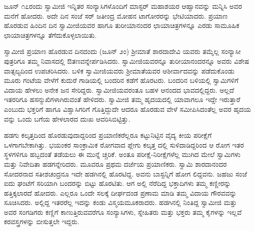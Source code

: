 ಜೂನ್ ೧೭ರಂದು ಸ್ವಾಮೀಜಿ ಇನ್ನಿತರ ಸಂನ್ಯಾಸಿಗಳೊಂದಿಗೆ ಮಾಸ್ಟರ್ ಮಹಾಶಯರ ಆಹ್ವಾನವನ್ನು ಮನ್ನಿಸಿ ಅವರ ಮನೆಗೆ ಹೋದರು. ಅದೇ ದಿನ ಸಂಜೆ ಸರ್ ಜತೀಂದ್ರ ಮೋಹನ ಟಾಗೋರರನ್ನು ಭೇಟಿಯಾದರು. ಪ್ರಯಾಣ ಹೊರಡುವ ಹಿಂದಿನ ದಿನ ಸ್ವಾಮೀಜಿಯವರ ಹಾಗೂ ತುರೀಯಾನಂದರ ಛಾಯಾಚಿತ್ರಗಳನ್ನೂ ಎರಡು ಸಾಮೂಹಿಕ ಛಾಯಾಚಿತ್ರಗಳನ್ನೂ ತೆಗೆದುಕೊಳ್ಳಲಾಯಿತು.

ಸ್ವಾಮೀಜಿ ಪ್ರಯಾಣ ಹೊರಡುವ ದಿನದಂದು (ಜೂನ್ ೨ಂ) ಶ್ರೀಮಾತೆ ಶಾರದಾದೇವಿ ಯವರು ತಮ್ಮೆಲ್ಲ ಸಂನ್ಯಾಸೀ ಪುತ್ರರಿಗೂ ತಮ್ಮ ನಿವಾಸದಲ್ಲಿ ಔತಣವನ್ನೇರ್ಪಡಿಸಿದರು. ಸ್ವಾಮೀಜಿಯವರನ್ನೂ ತುರೀಯಾನಂದರನ್ನೂ ಅವರು ವಿಶೇಷ ವಾತ್ಸಲ್ಯದಿಂದ ಉಪಚರಿಸಿದರು. ಬಳಿಕ ಸ್ವಾಮೀಜಿಯವರು ಶ್ರೀಮಾತೆಯವರ ಆಶೀರ್ವಾದವನ್ನು ಪಡೆದುಕೊಂಡು ಮೂರು ಗಂಟೆಯ ವೇಳೆಗೆ ಕುದುರೆ ಗಾಡಿಯಲ್ಲಿ ಬಂದರಿನ ಕಡೆಗೆ ಹೊರಟರು. ಬಂದರಿನ ಬಳಿಯಲ್ಲಿ ಸ್ವಾಮಿಗಳಿಗೆ ವಿದಾಯ ಹೇಳಲು ಅನೇಕ ಜನ ಸೇರಿದ್ದರು. ಸ್ವಾಮೀಜಿಯವರಂತೂ ಬಹಳ ಆನಂದದ ಭಾವದಲ್ಲಿದ್ದರು. ಅಲ್ಲದೆ ಇತರರಿಗೂ ಹಸನ್ಮುಖಿಗಳಾಗಿರುವಂತೆ ಹೇಳಿದರು. ಸ್ವಾಮೀಜಿ ತಮ್ಮ ಹೃದಯದಲ್ಲಿ ಯಾವಾಗಲೂ ಇದ್ದೇ ಇರುತ್ತಾರೆ ಎಂಬುದು ಭಕ್ತರಿಗೆ ಹಾಗೂ ವಿಶ್ವಾಸಿಗರಿಗೆ ಗೊತ್ತಿದ್ದುದೇ ಆದರೂ ಹೊರಡುವ ವೇಳೆ ಸಮೀಪಿಸಿದಂತೆಲ್ಲ ಅವರ ಹೃದಯ ವನ್ನು ಒಂದು ಬಗೆಯ ಹೇಳಲಾರದ ದುಃಖ ಆವರಿಸಿಬಿಟ್ಟಿತ್ತು.

ಹಡಗು ಕಲ್ಕತ್ತದಿಂದ ಹೊರಡುವುದಾದ್ದರಿಂದ ಪ್ರಯಾಣಿಕರೆಲ್ಲರೂ ಕಟ್ಟುನಿಟ್ಟಿನ ವೈದ್ಯ ಕೀಯ ಪರೀಕ್ಷೆಗೆ ಒಳಗಾಗಬೇಕಾಗಿತ್ತು. ಭಯಂಕರ ಸಾಂಕ್ರಾಮಿಕ ರೋಗವಾದ ಪ್ಲೇಗು ಕಲ್ಕತ್ತ ದಲ್ಲಿ ಸುಳಿದಾಡಿದ್ದರಿಂದ ಆ ರೋಗ ಇತರ ಸ್ಥಳಗಳಿಗೂ ಹಬ್ಬದಂತೆ ತಡೆಯಲು ಈ ಮುನ್ನೆ ಚ್ಚರಿಕೆ. ಅಂತೂ ಪರೀಕ್ಷೆ-ನಿರೀಕ್ಷೆಗಳೆಲ್ಲ ಮುಗಿದ ಮೇಲೆ ಸ್ವಾಮಿಗಳು ಮತ್ತು ನಿವೇದಿತಾ ಹಡಗನ್ನೇರಿದರು. ಮೂವರೂ ಪ್ರಥಮ ದರ್ಜೆಯ ಪ್ರಯಾಣಿಕರು. ಸ್ವಾಮಿ ಶಾರದಾನಂದರ ಸೋದರನಾದ ಸತೀಶಚಂದ್ರನೂ ಇದೇ ಹಡಗಿನಲ್ಲಿ ಹೊರಟಿದ್ದ. ಅವನು ಬಾಸ್ಟನ್ನಿಗೆ ಹೋಗ ಲಿದ್ದವನು. ಜಹಜು ಸಂಜೆ ಐದು ಘಂಟೆಗೆ ಸರಿಯಾಗಿ ಬಂದರನ್ನು ಬಿಟ್ಟು ಹೊರಟಿತು. ಆಗ ಅಲ್ಲಿ ನೆರೆದಿದ್ದ ಭಕ್ತಾದಿಗಳು ತಮ್ಮ ಕಣ್ಣೀರನ್ನು ಹತ್ತಿಕ್ಕಲಾರದೆ ಹೋದರು. ಎಲ್ಲರೂ ಒಂದೇ ಸಲಕ್ಕೆ ದೀರ್ಘದಂಡ ಪ್ರಣಾಮ ಮಾಡಿ ತಮ್ಮ ವಿದಾಯ ಗೌರವವನ್ನು ಸೂಚಿಸಿದರು. ಅಲ್ಲಿದ್ದ ಇತರರೆಲ್ಲ ಇದನ್ನು ಕಂಡು ವಿಸ್ಮಯಮೂಕರಾದರು. ಹಡಗಿನಲ್ಲಿ ನಿಂತಿದ್ದ ಸ್ವಾಮೀಜಿ ಮತ್ತು ಅವರ ಸಂಗಡಿಗರು ಕಣ್ಣಿಗೆ ಕಾಣುತ್ತಿರುವವರೆಗೂ ಸಂನ್ಯಾಸಿಗಳು, ಸ್ನೇಹಿತರು ಮತ್ತು ಭಕ್ತರು ತಮ್ಮ ಕೈಗಳನ್ನು ಇಲ್ಲವೆ ಕರವಸ್ತ್ರಗಳನ್ನು ಬೀಸುತ್ತಲೇ ಇದ್ದರು.

